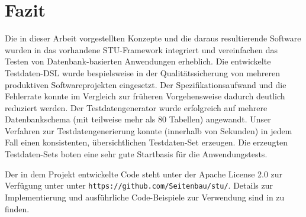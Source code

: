 \section{Fazit}

Die in dieser Arbeit vorgestellten Konzepte und die daraus resultierende Software wurden in das vorhandene STU-Framework integriert und vereinfachen das Testen von Datenbank-basierten Anwendungen erheblich.
%
Die entwickelte Testdaten-DSL wurde bespielsweise in der Qualitätssicherung von mehreren produktiven Softwareprojekten eingesetzt.
%
Der Spezifikationsaufwand und die Fehlerrate konnte  im Vergleich zur früheren Vorgehensweise dadurch deutlich reduziert werden.
%
Der Testdatengenerator wurde erfolgreich auf mehrere Datenbankschema (mit teilweise mehr als 80 Tabellen) angewandt.
%
Unser Verfahren zur Testdatengenerierung konnte (innerhalb von Sekunden) in jedem Fall  einen konsistenten, übersichtlichen Testdaten-Set erzeugen.
Die erzeugten Testdaten-Sets boten eine sehr gute Startbasis für die Anwendungstests.

Der  in dem Projekt entwickelte Code steht  unter der Apache License 2.0 zur Verfügung unter unter \texttt{https://github.com/Seitenbau/stu/}. 
%
Details zur Implementierung und ausführliche Code-Beispiele zur Verwendung sind in \cite{MT:Moll:2013} zu finden.